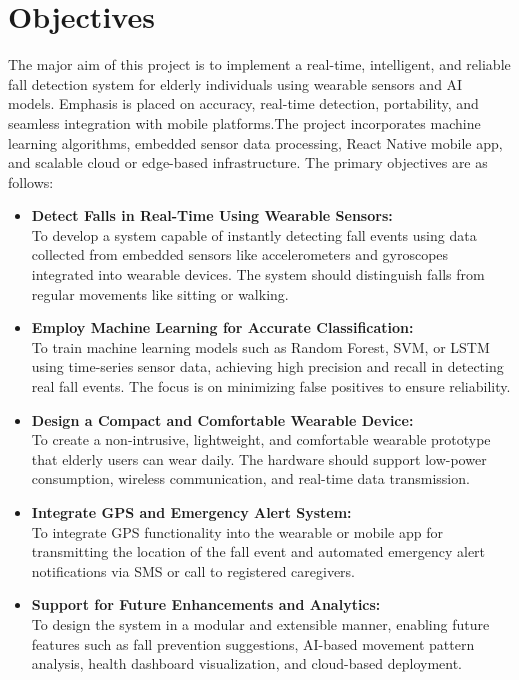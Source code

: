 \documentclass[a4paper, 12pt]{report}
\begin{document}
\section{Objectives}
The major aim of this project is to implement a real-time, intelligent, and reliable fall detection system for elderly individuals using wearable sensors and AI models. Emphasis is placed on accuracy, real-time detection, portability, and seamless integration with mobile platforms.The project incorporates machine learning algorithms, embedded sensor data processing, React Native mobile app, and scalable cloud or edge-based infrastructure. 
The primary objectives are as follows:

\begin{itemize}[itemsep=-4pt]
    \item \textbf{Detect Falls in Real-Time Using Wearable Sensors:}\\
        To develop a system capable of instantly detecting fall events using data collected from embedded sensors like accelerometers and gyroscopes integrated into wearable devices. The system should distinguish falls from regular movements like sitting or walking.
    \item \textbf{Employ Machine Learning for Accurate Classification:}\\
        To train machine learning models such as Random Forest, SVM, or LSTM using time-series sensor data, achieving high precision and recall in detecting real fall events. The focus is on minimizing false positives to ensure reliability.
    \item \textbf{Design a Compact and Comfortable Wearable Device:}\\
        To create a non-intrusive, lightweight, and comfortable wearable prototype that elderly users can wear daily. The hardware should support low-power consumption, wireless communication, and real-time data transmission.
    \item \textbf{Integrate GPS and Emergency Alert System:}\\
        To integrate GPS functionality into the wearable or mobile app for transmitting the location of the fall event and automated emergency alert notifications via SMS or call to registered caregivers.
    \item \textbf{Support for Future Enhancements and Analytics:}\\
        To design the system in a modular and extensible manner, enabling future features such as fall prevention suggestions, AI-based movement pattern analysis, health dashboard visualization, and cloud-based deployment.


\end{itemize}
\end{document}
